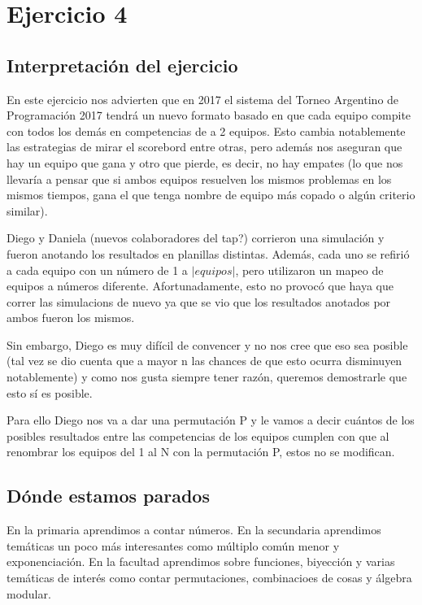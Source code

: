 \section{Ejercicio 4}

\subsection{Interpretación del ejercicio}

En este ejercicio nos advierten que en 2017 el sistema del Torneo Argentino de Programación 2017 tendrá un nuevo formato basado en que cada equipo compite con todos los demás en competencias de a 2 equipos. Esto cambia notablemente las estrategias de mirar el scorebord entre otras, pero además nos aseguran que hay un equipo que gana y otro que pierde, es decir, no hay empates (lo que nos llevaría a pensar que si ambos equipos resuelven los mismos problemas en los mismos tiempos, gana el que tenga nombre de equipo más copado o algún criterio similar). \newline

Diego y Daniela (nuevos colaboradores del tap?) corrieron una simulación y fueron anotando los resultados en planillas distintas. Además, cada uno se refirió a cada equipo con un número de 1 a $|equipos|$, pero utilizaron un mapeo de equipos a números diferente. Afortunadamente, esto no provocó que haya que correr las simulacions de nuevo ya que se vio que los resultados anotados por ambos fueron los mismos. \newline

Sin embargo, Diego es muy difícil de convencer y no nos cree que eso sea posible (tal vez se dio cuenta que a mayor n las chances de que esto ocurra disminuyen notablemente) y como nos gusta siempre tener razón, queremos demostrarle que esto sí es posible. \newline

Para ello Diego nos va a dar una permutación P y le vamos a decir cuántos de los posibles resultados entre las competencias de los equipos cumplen con que al renombrar los equipos del 1 al N con la permutación P, estos no se modifican. \newline

\subsection{Dónde estamos parados}

En la primaria aprendimos a contar números. En la secundaria aprendimos temáticas un poco más interesantes como múltiplo común menor y exponenciación. En la facultad aprendimos sobre funciones, biyección y varias temáticas de interés como contar permutaciones, combinacioes de cosas y álgebra modular. \newline 


